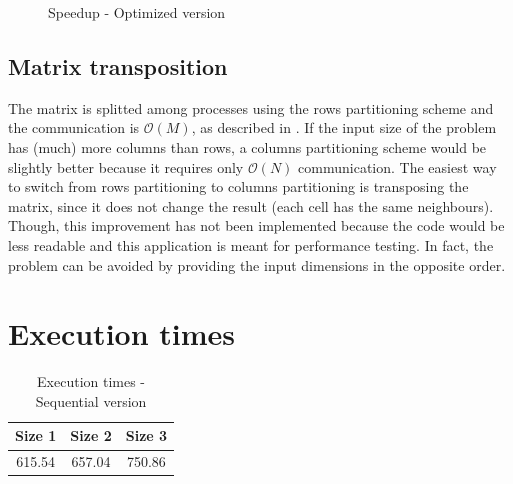 \documentclass{article}
\begin{document}
\begin{figure}
\centering
{}
\caption{Speedup - Optimized version}
\label{fig:speedupoptimized}
\end{figure}


\subsection{Matrix transposition}
The matrix is splitted among processes using the rows partitioning scheme and the communication is $\mathcal{O}(M)$, as described in . If the input size of the problem has (much) more columns than rows, a columns partitioning scheme would be slightly better because it requires only $\mathcal{O}(N)$ communication. The easiest way to switch from rows partitioning to columns partitioning is transposing the matrix, since it does not change the result (each cell has the same neighbours). Though, this improvement has not been implemented because the code would be less readable and this application is meant for performance testing. In fact, the problem can be avoided by providing the input dimensions in the opposite order.

\appendix

\section{Execution times}

\begin{table}[H]
\centering
\begin{tabular}{|c|c|c|}
\hline
Size 1 & Size 2 & Size 3 \\
\hline
615.54 & 657.04 & 750.86 \\
\hline
\end{tabular}
\caption{Execution times - Sequential version} \label{tab:sequentialtimes}
\end{table}
\end{document}
